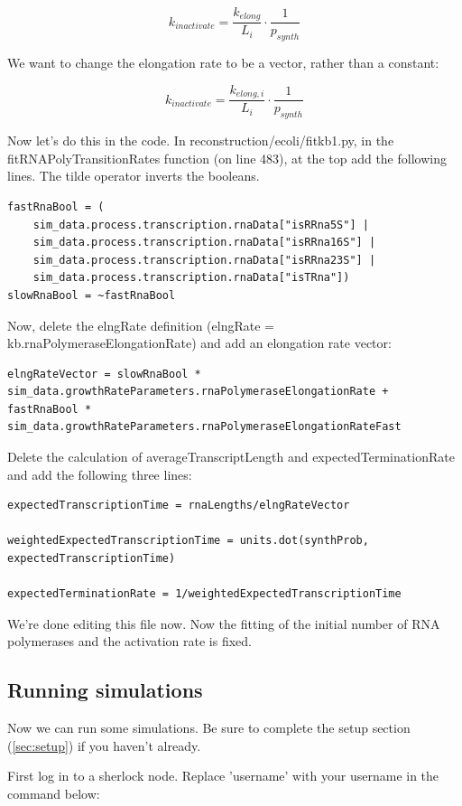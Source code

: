 \documentclass[12pt]{article}
\begin{document}
$$
k_{inactivate}=\frac{k_{elong}}{L_i}\cdot\frac{1}{p_{synth}}
$$

We want to change the elongation rate to be a vector, rather than a constant:

$$
k_{inactivate}=\frac{k_{elong,i}}{L_i}\cdot \frac{1}{p_{synth}}
$$

Now let’s do this in the code. In reconstruction/ecoli/fitkb1.py, in the fitRNAPolyTransitionRates function (on line 483), at the top add the following lines. The tilde operator inverts the booleans.

\begin{lstlisting}
fastRnaBool = (
    sim_data.process.transcription.rnaData["isRRna5S"] |
    sim_data.process.transcription.rnaData["isRRna16S"] |
    sim_data.process.transcription.rnaData["isRRna23S"] |
    sim_data.process.transcription.rnaData["isTRna"])
slowRnaBool = ~fastRnaBool
\end{lstlisting}

Now, delete the elngRate definition (elngRate = kb.rnaPolymeraseElongationRate) and add an elongation rate vector:

\begin{lstlisting}
elngRateVector = slowRnaBool * sim_data.growthRateParameters.rnaPolymeraseElongationRate + fastRnaBool * sim_data.growthRateParameters.rnaPolymeraseElongationRateFast
\end{lstlisting}

Delete the calculation of averageTranscriptLength and expectedTerminationRate and add the following three lines:

\begin{lstlisting}
expectedTranscriptionTime = rnaLengths/elngRateVector

weightedExpectedTranscriptionTime = units.dot(synthProb, expectedTranscriptionTime)

expectedTerminationRate = 1/weightedExpectedTranscriptionTime
\end{lstlisting}

We’re done editing this file now. Now the fitting of the initial number of RNA polymerases and the activation rate is fixed. 




\subsection{Running simulations}

Now we can run some simulations. Be sure to complete the setup section (\ref{sec:setup}) if you haven't already.
\par
First log in to a sherlock node. Replace 'username' with your username in the command below:
\end{document}
